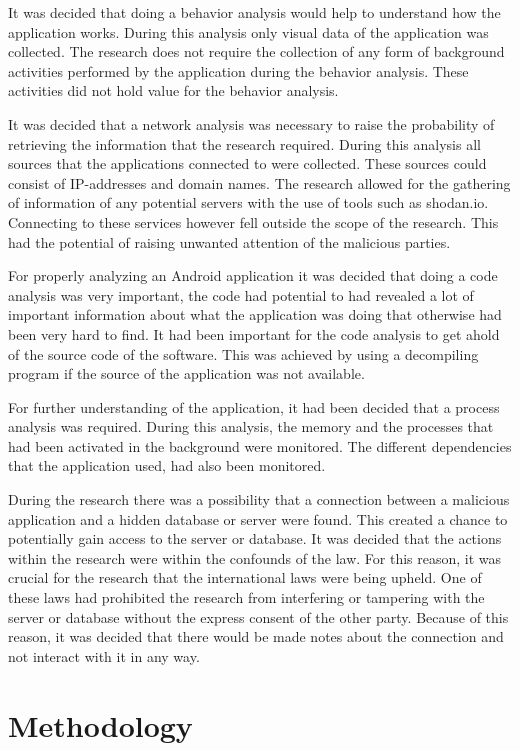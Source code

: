 \documentclass{article}
\begin{document}
It was decided that doing a behavior analysis would help to understand how the application works. During this analysis only visual data of the application was collected. The research does not require the collection of any form of background activities performed by the application during the behavior analysis. These activities did not hold value for the behavior analysis.

It was decided that a network analysis was necessary to raise the probability of retrieving the information that the research required. During this analysis all sources that the applications connected to were collected. These sources could consist of IP-addresses and domain names. The research allowed for the gathering of information of any potential servers with the use of tools such as shodan.io. Connecting to these services however fell outside the scope of the research. This had the potential of raising unwanted attention of the malicious parties.

For properly analyzing an Android application it was decided that doing a code analysis was very important, the code had potential to had revealed a lot of important information about what the application was doing that otherwise had been very hard to find. It had been important for the code analysis to get ahold of the source code of the software. This was achieved by using a decompiling program if the source of the application was not available.

For further understanding of the application, it had been decided that a process analysis was required. During this analysis, the memory and the processes that had been activated in the background were monitored. The different dependencies that the application used, had also been monitored.

During the research there was a possibility that a connection between a malicious application and a hidden database or server were found. This created a chance to potentially gain access to the server or database. It was decided that the actions within the research were within the confounds of the law. For this reason, it was crucial for the research that the international laws were being upheld. One of these laws had prohibited the research from interfering or tampering with the server or database without the express consent of the other party. Because of this reason, it was decided that there would be made notes about the connection and not interact with it in any way.

\newpage
\section{Methodology}
\end{document}
